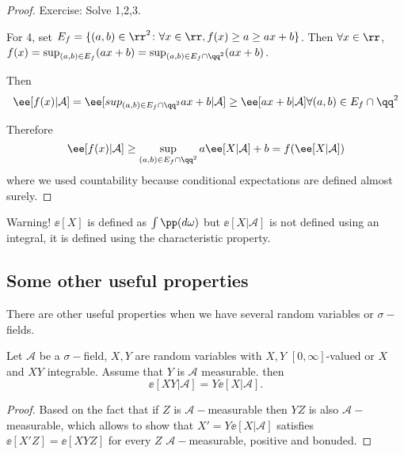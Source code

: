 \documentclass[../main.tex]{subfiles}
\begin{document}
    \begin{proof}
      Exercise: Solve 1,2,3.
      \vspace{0.4em}

      For 4, set $E_f = \{ (a, b) \in \rr^2 \colon \forall x \in \rr, f(x) \geq
      a \geq ax + b\}$. Then $\forall x \in \rr$, $f(x) = \sup_{(a, b) \in E_f}
      (ax + b) = \sup_{(a, b) \in E_f \cap \qq^2} (ax + b)$.

      Then $$\ee[f(x) | \mathcal{A}] = \ee[sup_{(a, b) \in E_f \cap \qq^2} ax +
      b | \mathcal{A}] \geq \ee[ax + b | \mathcal{A}] \forall (a, b) \in E_f
      \cap \qq^2$$

      Therefore
      \[
        \ee[f(x) | \mathcal{A} ] \geq \sup_{(a, b) \in E_f \cap \qq^2} a\ee[X
        | \mathcal{A}] + b = f(\ee[X | \mathcal{A}])
      \] 
      where we used countability because conditional expectations are defined
      almost surely.
    \end{proof}

    {\color{red} Warning!} $\ee[X]$ is defined as $\int \pp(d\omega)$ but $\ee[X
    | \mathcal{A}]$ is not defined using an integral, it is defined using the
    characteristic property.

    \subsection{Some other useful properties}
    There are other useful properties when we have several random variables or
    $\sigma-$fields.

    \begin{proposition}
        Let $\mathcal{A}$ be a $\sigma-$field, $X, Y$ are random variables with
        $X, Y$ $[0, \infty]$-valued or $X$ and $XY$ integrable. Assume that $Y$ is
        $\mathcal{A}$ measurable.
        then
        \[
          \ee[XY | \mathcal{A}] = Y \ee[X |\mathcal{A}]
        .\] 
    \end{proposition}
    \begin{proof}
        Based on the fact that if $Z$ is $\mathcal{A}-$measurable then $YZ$ is
        also $\mathcal{A}-$measurable, which allows to show that $ X' = Y\ee[X |
        \mathcal{A}]$ satisfies $\ee[X' Z] = \ee[XYZ]$ for every $Z$
        $\mathcal{A}-$measurable, positive and bonuded.
    \end{proof}
\end{document}
